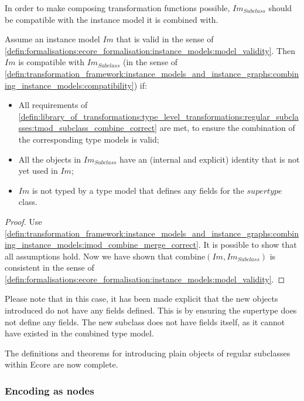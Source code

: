 In order to make composing transformation functions possible, $Im_{Subclass}$ should be compatible with the instance model it is combined with.

\begin{thm}
\label{defin:library_of_transformations:instance_level_transformations:objects_of_subtype:imod_subclass_combine_correct}
Assume an instance model $Im$ that is valid in the sense of \cref{defin:formalisations:ecore_formalisation:instance_models:model_validity}. Then $Im$ is compatible with $Im_{Subclass}$ (in the sense of \cref{defin:transformation_framework:instance_models_and_instance_graphs:combining_instance_models:compatibility}) if:
\begin{itemize}
    \item All requirements of \cref{defin:library_of_transformations:type_level_transformations:regular_subclasses:tmod_subclass_combine_correct} are met, to ensure the combination of the corresponding type models is valid;
    \item All the objects in $Im_{Subclass}$ have an (internal and explicit) identity that is not yet used in $Im$;
    \item $Im$ is not typed by a type model that defines any fields for the $supertype$ class.
\end{itemize}
\end{thm}

\begin{proof}
Use \cref{defin:transformation_framework:instance_models_and_instance_graphs:combining_instance_models:imod_combine_merge_correct}. It is possible to show that all assumptions hold. Now we have shown that $\mathrm{combine}(Im, Im_{Subclass})$ is consistent in the sense of \cref{defin:formalisations:ecore_formalisation:instance_models:model_validity}.
\end{proof}

Please note that in this case, it has been made explicit that the new objects introduced do not have any fields defined. This is by ensuring the supertype does not define any fields. The new subclass does not have fields itself, as it cannot have existed in the combined type model.

The definitions and theorems for introducing plain objects of regular subclasses within Ecore are now complete. 

\subsubsection{Encoding as nodes}

